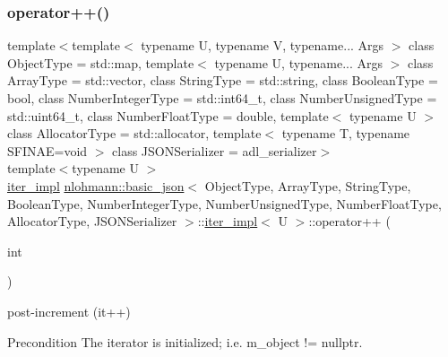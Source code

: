\subsubsection{\texorpdfstring{operator++()}{operator++()}\hspace{0.1cm}{\footnotesize\ttfamily [1/2]}}
{\footnotesize\ttfamily template$<$template$<$ typename U, typename V, typename... Args $>$ class Object\+Type = std\+::map, template$<$ typename U, typename... Args $>$ class Array\+Type = std\+::vector, class String\+Type  = std\+::string, class Boolean\+Type  = bool, class Number\+Integer\+Type  = std\+::int64\+\_\+t, class Number\+Unsigned\+Type  = std\+::uint64\+\_\+t, class Number\+Float\+Type  = double, template$<$ typename U $>$ class Allocator\+Type = std\+::allocator, template$<$ typename T, typename S\+F\+I\+N\+A\+E=void $>$ class J\+S\+O\+N\+Serializer = adl\+\_\+serializer$>$ \\
template$<$typename U $>$ \\
\mbox{\hyperlink{classnlohmann_1_1basic__json_1_1iter__impl}{iter\+\_\+impl}} \mbox{\hyperlink{classnlohmann_1_1basic__json}{nlohmann\+::basic\+\_\+json}}$<$ Object\+Type, Array\+Type, String\+Type, Boolean\+Type, Number\+Integer\+Type, Number\+Unsigned\+Type, Number\+Float\+Type, Allocator\+Type, J\+S\+O\+N\+Serializer $>$\+::\mbox{\hyperlink{classnlohmann_1_1basic__json_1_1iter__impl}{iter\+\_\+impl}}$<$ U $>$\+::operator++ (\begin{DoxyParamCaption}\item[{int}]{ }\end{DoxyParamCaption})\hspace{0.3cm}{\ttfamily [inline]}}



post-\/increment (it++) 

\begin{DoxyPrecond}{Precondition}
The iterator is initialized; i.\+e. {\ttfamily m\+\_\+object != nullptr}. 
\end{DoxyPrecond}
\mbox{\label{classnlohmann_1_1basic__json_1_1iter__impl_a60e2723dae1c6d537fc914c664f1a81c}} 
